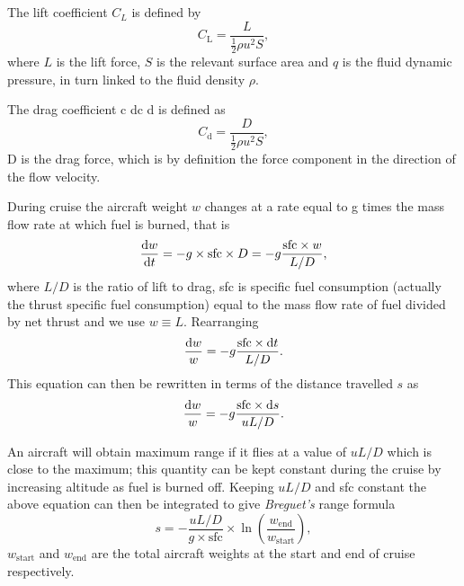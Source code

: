 \documentclass[12pt]{article}
\begin{document}
\section{}

The lift coefficient $C_L$ is defined by
\begin{equation}
	C_\mathrm{L} = \frac{L}{\frac{1}{2}\rho u^2 S},
\end{equation}
where  $L$ is the lift force,  $S$ is the relevant surface area and $q$ is the fluid dynamic pressure, in turn linked to the fluid density $\rho$.

The drag coefficient c dc d is defined as
\begin{equation}
	{ C_{\mathrm {d} }={\dfrac D{\frac{1}{2}\rho u^{2}S}}},
\end{equation}
D is the drag force, which is by definition the force component in the direction of the flow velocity.

During cruise the aircraft weight $w$ changes at a rate equal to g times the mass flow rate at which fuel is burned, that is
\begin{equation}
	\frac{\dif w}{\dif t} = - g \times \mathrm{sfc} \times D = - g \frac{\mathrm{sfc}\times w}{L/D},
\end{equation}
where $L/D$ is the ratio of lift to drag, sfc is specific fuel consumption (actually the thrust specific fuel consumption) equal to the mass flow rate of fuel divided by net thrust and we use $w \equiv L$. Rearranging
\begin{equation}
	\frac{\dif w}{w} = - g \frac{\mathrm{sfc}\times \dif t}{L/D}.
\end{equation}
This equation can then be rewritten in terms of the distance travelled $s$ as
\begin{equation}
	\frac{\dif w}{w} = - g \frac{\mathrm{sfc}\times \dif s}{uL/D}.
\end{equation}

An aircraft will obtain maximum range if it flies at a value of $uL/D$ which is close to the maximum; this quantity can be kept constant during the cruise by increasing altitude as fuel is burned off. Keeping $uL/D$ and sfc constant the above equation can then be integrated to give \emph{Breguet's} range formula
\begin{equation}
	s=-\frac{uL/D}{g\times \mathrm{sfc}}\times\ln\left(\frac{w_\mathrm{end}}{w_\mathrm{start}}\right),
\end{equation}
$w_\mathrm{start}$ and $w_\mathrm{end}$ are the total aircraft weights at the start and end of cruise respectively.
\end{document}
